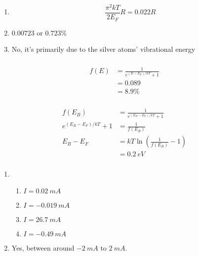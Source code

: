 \documentclass{article}
\begin{document}
\setcounter{subsubsection}{22}
\subsubsection{}

\begin{enumerate}
  \item \[\frac{\pi^2 k T}{2 E_F} R = 0.022 R\]

  \item $0.00723$ or $0.723\%$

  \item No, it's primarily due to the silver atoms' vibrational energy
\end{enumerate}

\setcounter{subsubsection}{24}
\subsubsection{}

\begin{align*}
  f(E) & = \frac{1}{e^{(E - E_F) / k T} + 1} \\
       & = 0.089                             \\
       & = 8.9\%
\end{align*}

\setcounter{subsubsection}{26}
\subsubsection{}

\begin{align*}
  f(E_B)                    & = \frac{1}{e^{(E_B - E_F) / k T} + 1}         \\
  e^{(E_B - E_F) / k T} + 1 & = \frac{1}{f(E_B)}                            \\
  E_B - E_F                 & = k T \ln \left( \frac{1}{f(E_B)} - 1 \right) \\
                            & = \qty{0.2}{eV}
\end{align*}

\setcounter{subsubsection}{28}
\subsubsection{}

\begin{enumerate}
  \item

        \begin{enumerate}
          \item $I = \qty{0.02}{mA}$

          \item $I = \qty{-0.019}{mA}$

          \item $I = \qty{26.7}{mA}$

          \item $I = \qty{-0.49}{mA}$
        \end{enumerate}

  \item Yes, between around $\qty{-2}{mA}$ to $\qty{2}{mA}$.
\end{enumerate}
\end{document}
